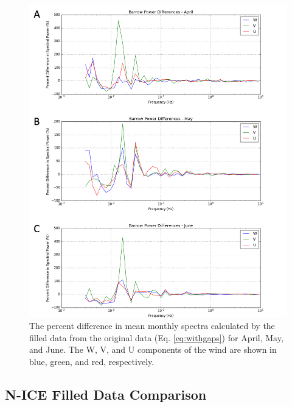   \begin{figure}[h]
    \centering
    \includegraphics[width=1\linewidth]{figures/appendixb/barrow_power_april.png}
    \caption[Barrow, Alaska power spectra]{The percent difference in mean monthly spectra calculated by the filled data from the original data (Eq. \ref{eq:withgaps}) for April, May, and June. The W, V, and U components of the wind are shown in blue, green, and red, respectively.}
    \label{fig:barrow_diff}
\end{figure}


\subsection{N-ICE Filled Data Comparison}

